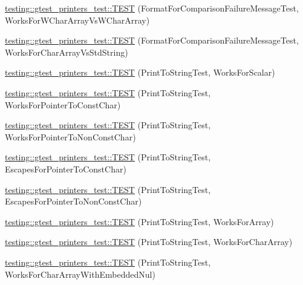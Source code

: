 \begin{DoxyCompactItemize}
\item 
\mbox{\hyperlink{namespacetesting_1_1gtest__printers__test_af4b502fb5745d2ee0bfb81d1c8eb95f6}{testing\+::gtest\+\_\+printers\+\_\+test\+::\+T\+E\+ST}} (Format\+For\+Comparison\+Failure\+Message\+Test, Works\+For\+W\+Char\+Array\+Vs\+W\+Char\+Array)
\item 
\mbox{\hyperlink{namespacetesting_1_1gtest__printers__test_ac2300073f401f783ff7b1ef97d2cbd6d}{testing\+::gtest\+\_\+printers\+\_\+test\+::\+T\+E\+ST}} (Format\+For\+Comparison\+Failure\+Message\+Test, Works\+For\+Char\+Array\+Vs\+Std\+String)
\item 
\mbox{\hyperlink{namespacetesting_1_1gtest__printers__test_a5d1bc4b12c18ccaec2ced9f45c092567}{testing\+::gtest\+\_\+printers\+\_\+test\+::\+T\+E\+ST}} (Print\+To\+String\+Test, Works\+For\+Scalar)
\item 
\mbox{\hyperlink{namespacetesting_1_1gtest__printers__test_a68100148758516ebab9c761ca7778586}{testing\+::gtest\+\_\+printers\+\_\+test\+::\+T\+E\+ST}} (Print\+To\+String\+Test, Works\+For\+Pointer\+To\+Const\+Char)
\item 
\mbox{\hyperlink{namespacetesting_1_1gtest__printers__test_a1db34d8760c17157572ce2877007d15a}{testing\+::gtest\+\_\+printers\+\_\+test\+::\+T\+E\+ST}} (Print\+To\+String\+Test, Works\+For\+Pointer\+To\+Non\+Const\+Char)
\item 
\mbox{\hyperlink{namespacetesting_1_1gtest__printers__test_ab8fce4287e837cfcd851ded56b62f9ce}{testing\+::gtest\+\_\+printers\+\_\+test\+::\+T\+E\+ST}} (Print\+To\+String\+Test, Escapes\+For\+Pointer\+To\+Const\+Char)
\item 
\mbox{\hyperlink{namespacetesting_1_1gtest__printers__test_a7203081ef422f0835643d2c54b8ebf28}{testing\+::gtest\+\_\+printers\+\_\+test\+::\+T\+E\+ST}} (Print\+To\+String\+Test, Escapes\+For\+Pointer\+To\+Non\+Const\+Char)
\item 
\mbox{\hyperlink{namespacetesting_1_1gtest__printers__test_a78bd89af8a8505880b78ec2a001d3cb8}{testing\+::gtest\+\_\+printers\+\_\+test\+::\+T\+E\+ST}} (Print\+To\+String\+Test, Works\+For\+Array)
\item 
\mbox{\hyperlink{namespacetesting_1_1gtest__printers__test_ad122dc21e7ebad023d7048ef117a1129}{testing\+::gtest\+\_\+printers\+\_\+test\+::\+T\+E\+ST}} (Print\+To\+String\+Test, Works\+For\+Char\+Array)
\item 
\mbox{\hyperlink{namespacetesting_1_1gtest__printers__test_a65e208358dddc7747f4519410c71d877}{testing\+::gtest\+\_\+printers\+\_\+test\+::\+T\+E\+ST}} (Print\+To\+String\+Test, Works\+For\+Char\+Array\+With\+Embedded\+Nul)

\end{DoxyCompactItemize}
